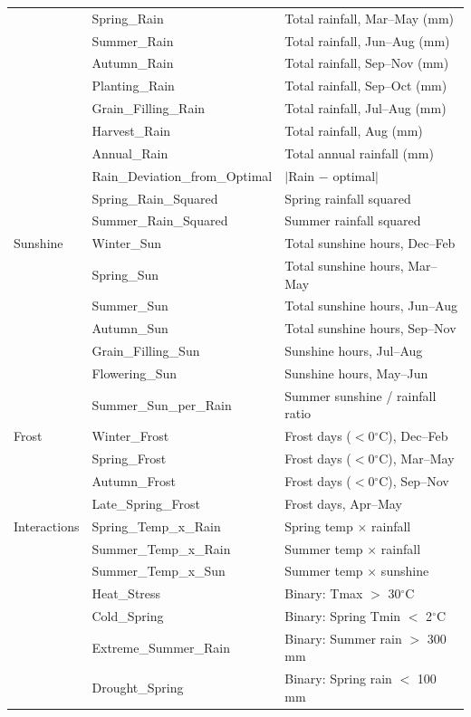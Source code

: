 \documentclass[12pt,a4paper]{report}
\newcommand{\degrees}{$^{\circ}$C}
\begin{document}
\begin{longtable}{lll}
& Spring\_Rain & Total rainfall, Mar--May (mm) \\
& Summer\_Rain & Total rainfall, Jun--Aug (mm) \\
& Autumn\_Rain & Total rainfall, Sep--Nov (mm) \\
& Planting\_Rain & Total rainfall, Sep--Oct (mm) \\
& Grain\_Filling\_Rain & Total rainfall, Jul--Aug (mm) \\
& Harvest\_Rain & Total rainfall, Aug (mm) \\
& Annual\_Rain & Total annual rainfall (mm) \\
& Rain\_Deviation\_from\_Optimal & $|$Rain $-$ optimal$|$ \\
& Spring\_Rain\_Squared & Spring rainfall squared \\
& Summer\_Rain\_Squared & Summer rainfall squared \\
\midrule
Sunshine & Winter\_Sun & Total sunshine hours, Dec--Feb \\
& Spring\_Sun & Total sunshine hours, Mar--May \\
& Summer\_Sun & Total sunshine hours, Jun--Aug \\
& Autumn\_Sun & Total sunshine hours, Sep--Nov \\
& Grain\_Filling\_Sun & Sunshine hours, Jul--Aug \\
& Flowering\_Sun & Sunshine hours, May--Jun \\
& Summer\_Sun\_per\_Rain & Summer sunshine / rainfall ratio \\
\midrule
Frost & Winter\_Frost & Frost days ($<$0\degrees{}), Dec--Feb \\
& Spring\_Frost & Frost days ($<$0\degrees{}), Mar--May \\
& Autumn\_Frost & Frost days ($<$0\degrees{}), Sep--Nov \\
& Late\_Spring\_Frost & Frost days, Apr--May \\
\midrule
Interactions & Spring\_Temp\_x\_Rain & Spring temp $\times$ rainfall \\
& Summer\_Temp\_x\_Rain & Summer temp $\times$ rainfall \\
& Summer\_Temp\_x\_Sun & Summer temp $\times$ sunshine \\
& Heat\_Stress & Binary: Tmax $>$ 30\degrees{} \\
& Cold\_Spring & Binary: Spring Tmin $<$ 2\degrees{} \\
& Extreme\_Summer\_Rain & Binary: Summer rain $>$ 300\,mm \\
& Drought\_Spring & Binary: Spring rain $<$ 100\,mm \\
\end{longtable}
\end{document}
